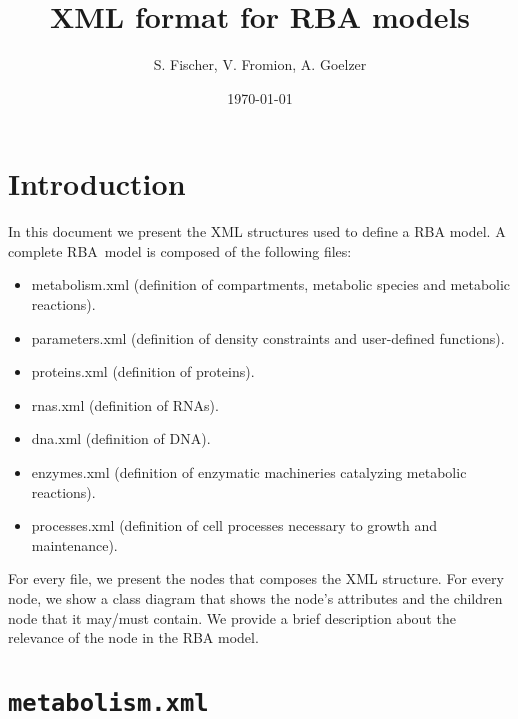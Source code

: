 \documentclass[12pt]{scrartcl}
\theoremstyle{definition}
\theoremstyle{remark}
\numberwithin{equation}{section}
\begin{document}
\title{XML format for RBA models}
\author{S. Fischer, V. Fromion, A. Goelzer}
\date{\today}

\maketitle

\newpage

\tableofcontents

\newpage

\section{Introduction}

In this document we present the XML structures used to define a RBA model.
A complete RBA model is composed of the following files:
\begin{itemize}
  \item metabolism.xml
  (definition of compartments, metabolic species and metabolic reactions).
  \item parameters.xml
  (definition of density constraints and user-defined functions).
  \item proteins.xml (definition of proteins).
  \item rnas.xml (definition of RNAs).
  \item dna.xml (definition of DNA).
  \item enzymes.xml
  (definition of enzymatic machineries catalyzing metabolic reactions).
  \item processes.xml
  (definition of cell processes necessary to growth and maintenance).
\end{itemize}

For every file, we present the nodes that composes the XML structure.
For every node, we show a class diagram that shows the node's attributes
and the children node that it may/must contain.
We provide a brief description about the relevance of the node
in the RBA model.

\section{\texttt{metabolism.xml}}
\end{document}
